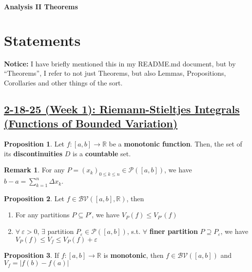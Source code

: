 \documentclass[12pt,a4paper]{article}
\theoremstyle{definition}
\newtheorem{proposition}{Proposition}
\newtheorem{remark}{Remark}
\begin{document}
\begin{center}
  {\Large \bf Analysis II Theorems}\\[6pt]
\end{center}

\section*{Statements}
\begin{mdframed}
\textbf{Notice:} I have briefly mentioned this in my README.md document, but by ``Theorems'', I refer to not just Theorems, but also Lemmas, Propositions, Corollaries and other things of the sort.
\end{mdframed}

\setcounter{subsection}{1}
\setcounter{theorem}{0}
\setcounter{lemma}{0}
\setcounter{proposition}{0}
\setcounter{corollary}{0}
\subsection*{\underline{\textbf{2-18-25 (Week 1): Riemann-Stieltjes Integrals (Functions of Bounded Variation)}}}
\begin{proposition}
    Let $f: [a, b] \rightarrow \mathbb{R}$ be a \textbf{monotonic function}. Then, the set of its \textbf{discontinuities} $D$ is a \textbf{countable} set.
\end{proposition}

\begin{remark}
  For any $P = (x_k)_{0 \leq k \leq n} \in \mathcal{P}([a, b])$, we have $b - a = \sum_{k = 1}^{n} \Delta x_k$.
\end{remark}

\begin{proposition}
  Let $f \in \mathcal{BV}([a, b], \mathbb{R})$, then
  \begin{enumerate} [(1)]
    \item For any partitions $P \subseteq P'$, we have \underline{$V_P(f) \leq V_{P'}(f)$}
    \item $\forall \ \varepsilon > 0$, $\exists$ partition $P_\varepsilon \in \mathcal{P}([a, b])$, s.t. $\forall$ \textbf{finer partition} $P \supseteq P_\varepsilon$, we have \underline{$V_P(f) \leq V_f \leq V_P(f) + \varepsilon$}
  \end{enumerate}
\end{proposition}

\begin{proposition}
  If $f: [a, b] \rightarrow \mathbb{R}$ is \textbf{monotonic}, then \underline{$f \in \mathcal{BV}([a, b])$} and \underline{$V_f = |f(b) - f(a)|$}
\end{proposition}
\end{document}
